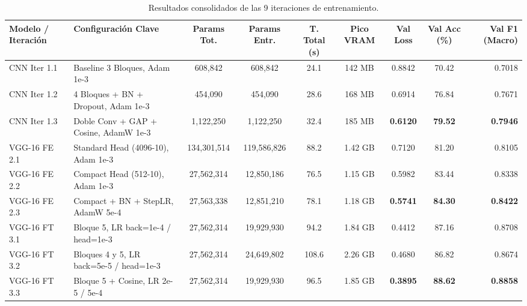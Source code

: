 \documentclass[10pt,twocolumn,a4paper]{article}
\begin{document}
\begin{table}[t!]
\centering
\footnotesize
\caption{Resultados consolidados de las 9 iteraciones de entrenamiento.}
\label{tab:iterations}
\begin{tabularx}{\textwidth}{llccccccr}
\toprule
\textbf{Modelo / Iteración} & \textbf{Configuración Clave} & \textbf{Params Tot.} & \textbf{Params Entr.} & \textbf{T. Total (s)} & \textbf{Pico VRAM} & \textbf{Val Loss} & \textbf{Val Acc (\%)} & \textbf{Val F1 (Macro)} \\
\midrule
CNN Iter 1.1 & Baseline 3 Bloques, Adam 1e-3 & 608,842 & 608,842 & 24.1 & 142 MB & 0.8842 & 70.42 & 0.7018 \\
CNN Iter 1.2 & 4 Bloques + BN + Dropout, Adam 1e-3 & 454,090 & 454,090 & 28.6 & 168 MB & 0.6914 & 76.84 & 0.7671 \\
CNN Iter 1.3 & Doble Conv + GAP + Cosine, AdamW 1e-3 & 1,122,250 & 1,122,250 & 32.4 & 185 MB & \textbf{0.6120} & \textbf{79.52} & \textbf{0.7946} \\
\midrule
VGG-16 FE 2.1 & Standard Head (4096-10), Adam 1e-3 & 134,301,514 & 119,586,826 & 88.2 & 1.42 GB & 0.7120 & 81.20 & 0.8105 \\
VGG-16 FE 2.2 & Compact Head (512-10), Adam 1e-3 & 27,562,314 & 12,850,186 & 76.5 & 1.15 GB & 0.5982 & 83.44 & 0.8338 \\
VGG-16 FE 2.3 & Compact + BN + StepLR, AdamW 5e-4 & 27,563,338 & 12,851,210 & 78.1 & 1.18 GB & \textbf{0.5741} & \textbf{84.30} & \textbf{0.8422} \\
\midrule
VGG-16 FT 3.1 & Bloque 5, LR back=1e-4 / head=1e-3 & 27,562,314 & 19,929,930 & 94.2 & 1.84 GB & 0.4412 & 87.16 & 0.8708 \\
VGG-16 FT 3.2 & Bloques 4 y 5, LR back=5e-5 / head=1e-3 & 27,562,314 & 24,649,802 & 108.6 & 2.26 GB & 0.4680 & 86.82 & 0.8674 \\
VGG-16 FT 3.3 & Bloque 5 + Cosine, LR 2e-5 / 5e-4 & 27,562,314 & 19,929,930 & 96.5 & 1.85 GB & \textbf{0.3895} & \textbf{88.62} & \textbf{0.8858} \\
\bottomrule
\end{tabularx}
\end{table}
\end{document}
